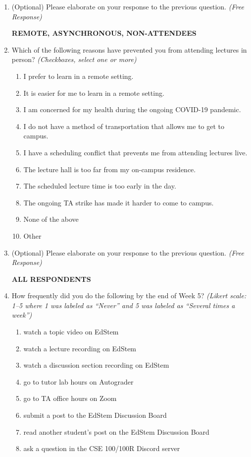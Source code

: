 \begin{enumerate}
    \item (Optional) Please elaborate on your response to the previous question. \textit{(Free Response)}

\noindent \textbf{REMOTE, ASYNCHRONOUS, NON-ATTENDEES}

    \item Which of the following reasons have prevented you from attending lectures in person? \textit{(Checkboxes, select one or more)}
    \begin{enumerate}
        \item I prefer to learn in a remote setting.
        \item It is easier for me to learn in a remote setting.
        \item I am concerned for my health during the ongoing COVID-19 pandemic.
        \item I do not have a method of transportation that allows me to get to campus.
        \item I have a scheduling conflict that prevents me from attending lectures live.
        \item The lecture hall is too far from my on-campus residence.
        \item The scheduled lecture time is too early in the day.
        \item The ongoing TA strike has made it harder to come to campus.
        \item None of the above
        \item Other
    \end{enumerate}

    \item (Optional) Please elaborate on your response to the previous question. \textit{(Free Response)}

\noindent \textbf{ALL RESPONDENTS}

    \item How frequently did you do the following by the end of Week 5? \textit{(Likert scale: 1–5 where 1 was labeled as ``Never'' and 5 was labeled as ``Several times a week'')}
    \begin{enumerate}
        \item watch a topic video on EdStem
        \item watch a lecture recording on EdStem
        \item watch a discussion section recording on EdStem
        \item go to tutor lab hours on Autograder
        \item go to TA office hours on Zoom
        \item submit a post to the EdStem Discussion Board
        \item read another student's post on the EdStem Discussion Board
        \item ask a question in the CSE 100/100R Discord server
    \end{enumerate}


\end{enumerate}
